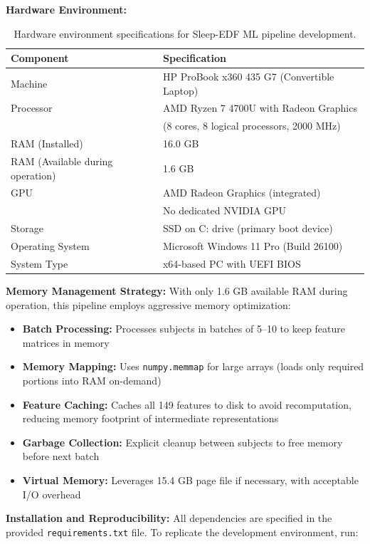 \documentclass{imc-inf} %
\begin{document}
\textbf{Hardware Environment:}

\begin{table}[ht]
\centering
\begin{tabular}{|l|l|}
\hline
\textbf{Component} & \textbf{Specification} \\
\hline
Machine & HP ProBook x360 435 G7 (Convertible Laptop) \\
\hline
Processor & AMD Ryzen 7 4700U with Radeon Graphics \\
 & (8 cores, 8 logical processors, 2000 MHz) \\
\hline
RAM (Installed) & 16.0 GB \\
\hline
RAM (Available during operation) & 1.6 GB \\
\hline
GPU & AMD Radeon Graphics (integrated) \\
 & No dedicated NVIDIA GPU \\
\hline
Storage & SSD on C: drive (primary boot device) \\
\hline
Operating System & Microsoft Windows 11 Pro (Build 26100) \\
\hline
System Type & x64-based PC with UEFI BIOS \\
\hline
\end{tabular}
\caption{Hardware environment specifications for Sleep-EDF ML pipeline development.}
\label{tab:hardware_env}
\end{table}

\textbf{Memory Management Strategy:}
With only 1.6 GB available RAM during operation, this pipeline employs aggressive memory optimization:
\begin{itemize}
	\item \textbf{Batch Processing:} Processes subjects in batches of 5--10 to keep feature matrices in memory
	\item \textbf{Memory Mapping:} Uses \texttt{numpy.memmap} for large arrays (loads only required portions into RAM on-demand)
	\item \textbf{Feature Caching:} Caches all 149 features to disk to avoid recomputation, reducing memory footprint of intermediate representations
	\item \textbf{Garbage Collection:} Explicit cleanup between subjects to free memory before next batch
	\item \textbf{Virtual Memory:} Leverages 15.4 GB page file if necessary, with acceptable I/O overhead
\end{itemize}

\textbf{Installation and Reproducibility:}
All dependencies are specified in the provided \texttt{requirements.txt} file. To replicate the development environment, run:
\end{document}
